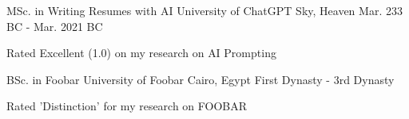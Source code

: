 


\begin{cventries}


\cventry
{MSc. in Writing Resumes with AI} %
{University of ChatGPT} %
{Sky, Heaven} %
{Mar. 233 BC - Mar. 2021 BC} %
{ %
    \begin{cvitems}{}
    \item {Rated Excellent (1.0) on my research on AI Prompting}\\ %
    \end{cvitems}
}



\cventry
{BSc. in Foobar} %
{University of Foobar} %
{Cairo, Egypt} %
{First Dynasty - 3rd Dynasty} %
{ %
    \begin{cvitems}{}
    \item {Rated 'Distinction' for my research on FOOBAR}
    \end{cvitems}
}


\end{cventries}
